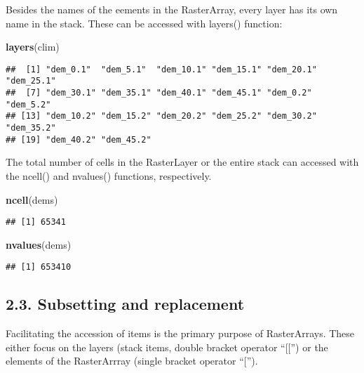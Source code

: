 \documentclass[]{article}
\newenvironment{Shaded}{\begin{snugshade}}{\end{snugshade}}
\newcommand{\KeywordTok}[1]{\textcolor[rgb]{0.13,0.29,0.53}{\textbf{#1}}}
\newcommand{\NormalTok}[1]{#1}
\begin{document}
Besides the names of the eements in the RasterArray, every layer has its
own name in the stack. These can be accessed with layers() function:

\begin{Shaded}
\begin{Highlighting}[]
\KeywordTok{layers}\NormalTok{(clim)}
\end{Highlighting}
\end{Shaded}

\begin{verbatim}
##  [1] "dem_0.1"  "dem_5.1"  "dem_10.1" "dem_15.1" "dem_20.1" "dem_25.1"
##  [7] "dem_30.1" "dem_35.1" "dem_40.1" "dem_45.1" "dem_0.2"  "dem_5.2" 
## [13] "dem_10.2" "dem_15.2" "dem_20.2" "dem_25.2" "dem_30.2" "dem_35.2"
## [19] "dem_40.2" "dem_45.2"
\end{verbatim}

The total number of cells in the RasterLayer or the entire stack can
accessed with the ncell() and nvalues() functions, respectively.

\begin{Shaded}
\begin{Highlighting}[]
\KeywordTok{ncell}\NormalTok{(dems)}
\end{Highlighting}
\end{Shaded}

\begin{verbatim}
## [1] 65341
\end{verbatim}

\begin{Shaded}
\begin{Highlighting}[]
\KeywordTok{nvalues}\NormalTok{(dems)}
\end{Highlighting}
\end{Shaded}

\begin{verbatim}
## [1] 653410
\end{verbatim}

\hypertarget{subsetting-and-replacement}{%
\subsection{2.3. Subsetting and
replacement}\label{subsetting-and-replacement}}

Facilitating the accession of items is the primary purpose of
RasterArrays. These either focus on the layers (stack items, double
bracket operator ``{[}{[}'') or the elements of the RasterArrray (single
bracket operator ``{[}'').
\end{document}
